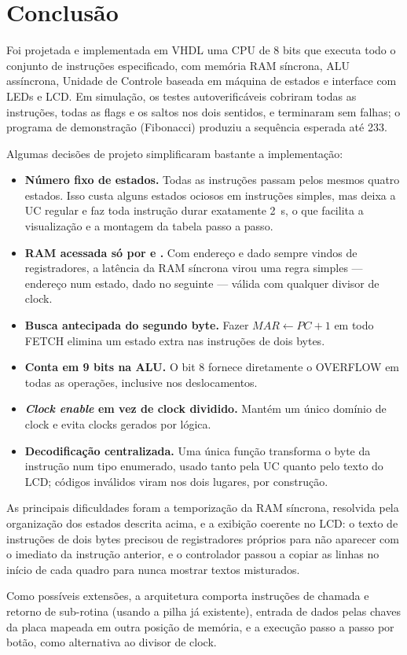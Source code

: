 \section{Conclusão}
\label{sec:conclusao}

Foi projetada e implementada em VHDL uma CPU de 8 bits que executa todo o
conjunto de instruções especificado, com memória RAM síncrona, ALU assíncrona,
Unidade de Controle baseada em máquina de estados e interface com LEDs e LCD.
Em simulação, os testes autoverificáveis cobriram todas as instruções, todas as
flags e os saltos nos dois sentidos, e terminaram sem falhas; o programa de
demonstração (Fibonacci) produziu a sequência esperada até 233.

Algumas decisões de projeto simplificaram bastante a implementação:

\begin{itemize}[nosep]
  \item \textbf{Número fixo de estados.} Todas as instruções passam pelos
        mesmos quatro estados. Isso custa alguns estados ociosos em instruções
        simples, mas deixa a UC regular e faz toda instrução durar exatamente
        \SI{2}{\second}, o que facilita a visualização e a montagem da tabela
        passo a passo.
  \item \textbf{RAM acessada só por  e .} Com endereço e dado
        sempre vindos de registradores, a latência da RAM síncrona virou uma
        regra simples --- endereço num estado, dado no seguinte --- válida com
        qualquer divisor de clock.
  \item \textbf{Busca antecipada do segundo byte.} Fazer $MAR \gets PC+1$ em
        todo FETCH elimina um estado extra nas instruções de dois bytes.
  \item \textbf{Conta em 9 bits na ALU.} O bit 8 fornece diretamente o
        OVERFLOW em todas as operações, inclusive nos deslocamentos.
  \item \textbf{\emph{Clock enable} em vez de clock dividido.} Mantém um único
        domínio de clock e evita clocks gerados por lógica.
  \item \textbf{Decodificação centralizada.} Uma única função transforma o
        byte da instrução num tipo enumerado, usado tanto pela UC quanto pelo
        texto do LCD; códigos inválidos viram  nos dois lugares, por
        construção.
\end{itemize}

As principais dificuldades foram a temporização da RAM síncrona, resolvida
pela organização dos estados descrita acima, e a exibição coerente no LCD: o
texto de instruções de dois bytes precisou de registradores próprios para não
aparecer com o imediato da instrução anterior, e o controlador passou a copiar
as linhas no início de cada quadro para nunca mostrar textos misturados.

Como possíveis extensões, a arquitetura comporta instruções de chamada e
retorno de sub-rotina (usando a pilha já existente), entrada de dados pelas
chaves da placa mapeada em outra posição de memória, e a execução passo a passo
por botão, como alternativa ao divisor de clock.
